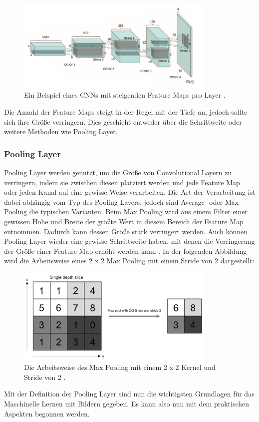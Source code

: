 \documentclass[11pt,bibliography=totocnumbered]{scrartcl}
\begin{document}
\begin{figure}[H]
	\centering
	\includegraphics[width=0.85\textwidth]{cnn_3d}
	\vspace*{-3mm}
	\caption[Beispiel eines CNNs mit mehreren Feature Maps]{Ein Beispiel eines CNNs mit steigenden Feature Maps pro Layer \cite[S.138]{DEEP_LEARNING_REVOLUTION}.}
	\label{fig:cnn_3d}
\end{figure}
\vspace*{-5mm}
Die Anzahl der Feature Maps steigt in der Regel mit der Tiefe an, jedoch sollte sich ihre Größe verringern. Dies geschieht entweder über die Schrittweite oder weitere Methoden wie Pooling Layer.
\subsubsection{Pooling Layer}
Pooling Layer werden genutzt, um die Größe von Convolutional Layern zu verringern, indem sie zwischen diesen platziert werden und jede Feature Map oder jeden Kanal auf eine gewisse Weise verarbeiten. Die Art der Verarbeitung ist dabei abhängig vom Typ des Pooling Layers, jedoch sind Average- oder Max Pooling die typischen Varianten. Beim Max Pooling wird aus einem Filter einer gewissen Höhe und Breite der größte Wert in diesem Bereich der Feature Map entnommen. Dadurch kann dessen Größe stark verringert werden. Auch können Pooling Layer wieder eine gewisse Schrittweite haben, mit denen die Verringerung der Größe einer Feature Map erhöht werden kann \cite[S.18-19]{DEEP_LEARNING_CV}\cite[S.369-370]{MACHINE_LEARNING}. In der folgenden Abbildung wird die Arbeitsweise eines 2 x 2 Max Pooling mit einem Stride von 2 dargestellt: 
\begin{figure}[H]
	\centering
	\includegraphics[width=0.85\textwidth]{pooling}
	\vspace*{-3mm}
	\caption[Arbeitsweise des Max Pooling]{Die Arbeitsweise des Max Pooling mit einem 2 x 2 Kernel und Stride von 2 \cite[S.19]{DEEP_LEARNING_CV}.}
	\label{fig:pooling}
\end{figure}
\vspace*{-5mm}
Mit der Definition der Pooling Layer sind nun die wichtigsten Grundlagen für das Maschinelle Lernen mit Bildern gegeben. Es kann also nun mit dem praktischen Aspekten begonnen werden.
\end{document}
